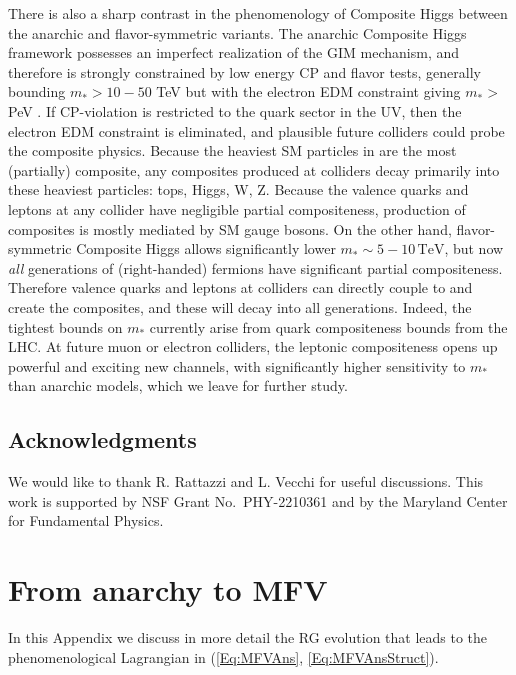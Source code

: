 \documentclass[aps,prl,twocolumn,showpacs,10pt,preprintnumbers,nofootinbib]{revtex4-2}
\newcommand{\TeV}{\,\mathrm{TeV}}
\newcommand{\mst}{m_*}
\begin{document}
{There is also a sharp contrast in the phenomenology of Composite Higgs between the anarchic and flavor-symmetric variants. The anarchic Composite Higgs framework possesses an imperfect realization of the GIM mechanism, and therefore is strongly constrained by low energy CP and flavor tests, generally bounding $\mst>10-50$ TeV but with the electron EDM constraint giving $m_* >$ PeV \cite{Frigerio:2018uwx}. If CP-violation is restricted to the quark sector in the UV, then the electron EDM constraint is eliminated, and plausible future  colliders could probe the composite physics. Because the heaviest SM particles in are the most (partially) composite, any composites produced at colliders decay primarily into these heaviest particles: tops, Higgs, W, Z. Because the valence quarks and leptons at any collider have negligible partial compositeness, production of composites is mostly mediated by SM gauge bosons.  On the other hand, flavor-symmetric Composite Higgs allows significantly lower $m_* \sim 5-10\TeV$, but now {\it all} generations  of (right-handed) fermions have significant partial compositeness. Therefore valence quarks and leptons at colliders can directly couple to and create the composites, and these will decay into all generations. Indeed, the tightest bounds on $m_*$ currently arise from quark compositeness bounds from the LHC. At future muon or electron colliders, the leptonic compositeness opens up powerful and exciting new channels, with significantly higher sensitivity to $\mst$ than anarchic models, which we leave for further study.  
 
\subsection*{Acknowledgments}

We would like to thank R. Rattazzi and L. Vecchi for useful discussions. This work is supported by NSF Grant No.~PHY-2210361 and by the Maryland Center for Fundamental Physics. 

\appendix
\section{From anarchy to MFV}\label{App:ExtraDetails}
In this Appendix we discuss in more detail the RG evolution that leads to the phenomenological Lagrangian in (\ref{Eq:MFVAns}, \ref{Eq:MFVAnsStruct}). 

}
\end{document}
